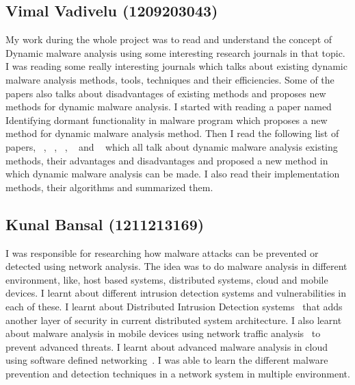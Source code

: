 \documentclass[11pt]{article}
\begin{document}
\subsection{Vimal Vadivelu (1209203043)}
My work during the whole project was to read and understand the concept of Dynamic malware analysis using some interesting research journals in that topic. I was reading some really interesting journals which talks about existing dynamic malware analysis methods, tools, techniques and their efficiencies. Some of the papers also talks about disadvantages of existing methods and proposes new methods for dynamic malware analysis. I started with reading a paper named Identifying dormant functionality in malware program which proposes a new method for dynamic malware analysis method. Then I read the following list of papers, ~\cite{irolla2016glassbox}, ~\cite{ki2015novel}, ~\cite{jerlin2015dynamic}, ~\cite{prayudi2015implementation} and ~\cite{massicotte2012testing} which all talk about dynamic malware analysis existing methods, their advantages and disadvantages and proposed a new method in which dynamic malware analysis can be made. I also read their implementation methods, their algorithms and summarized them. 



\subsection{Kunal Bansal (1211213169)}
I was responsible for researching how malware attacks can be prevented  or detected using network analysis. The idea was to do malware analysis in different environment, like, host based systems, distributed systems, cloud and mobile devices. I learnt about different intrusion detection systems and vulnerabilities in each of these. I learnt about Distributed Intrusion Detection systems~\cite{snapp1991dids} that adds another layer of security in current distributed system architecture. I also learnt about malware analysis in mobile devices using network traffic analysis~\cite{rossow2011sandnet} to prevent advanced threats. I learnt about advanced malware analysis in cloud using software defined networking~\cite{kim2013improving}. I was able to learn the different malware prevention and detection techniques in a network system in multiple environment.
\end{document}
